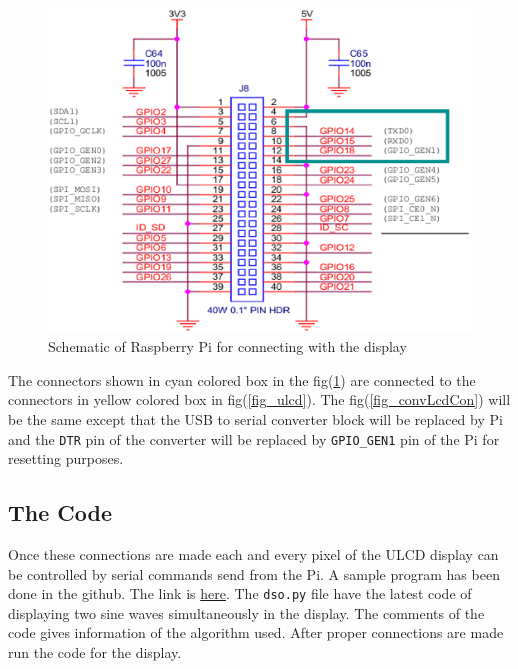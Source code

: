 \documentclass[12pt, a4paper, twoside]{article}
\begin{document}
\begin{figure}
	\centering
	\includegraphics[scale=0.65]{./fig/rpisch.eps}
	\caption{Schematic of Raspberry Pi for connecting with the display}
	\label{fig_pisch}
\end{figure}
	
The connectors shown in cyan colored box in the fig(\ref{fig_pisch}) are connected to the connectors in yellow colored box in fig(\ref{fig_ulcd}). The fig(\ref{fig_convLcdCon}) will be the same except that the USB to serial converter block will be replaced by Pi and the \texttt{DTR} pin of the converter will be replaced by \texttt{GPIO\_GEN1} pin of the Pi for resetting purposes.

\subsection{The Code}
	Once these connections are made each and every pixel of the ULCD display can be controlled by serial commands send from the Pi. A sample program has been done in the github. The link is \href{https://github.com/jinujayachandran/dso}{here}\cite{bib_code}. The \texttt{dso.py} file have the latest code of displaying two sine waves simultaneously in the display. The comments of the code gives information of the algorithm used. After proper connections are made run the code for the display.
\end{document}
